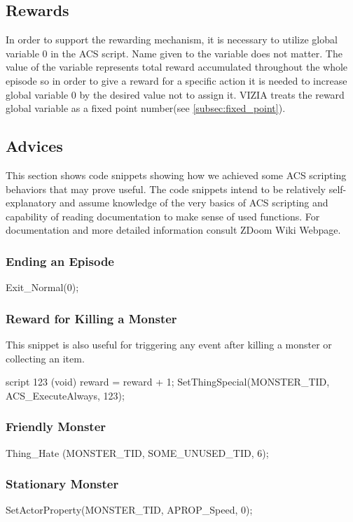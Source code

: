 \documentclass[english,bachelor,a4paper,twoside]{ppfcmthesis}
\begin{document}
	\subsection{Rewards}
		In order to support the rewarding mechanism, it is necessary to utilize global variable 0 in the ACS script. Name given to the variable does not matter. The value of the variable represents total reward accumulated throughout the whole episode so in order to give a reward for a specific action it is needed to increase global variable 0 by the desired value not to assign it. VIZIA treats the reward global variable as a fixed point number(see \ref{subsec:fixed_point}).

	\subsection{Advices}
		This section shows code snippets showing how we achieved some ACS scripting behaviors that may prove useful. The code snippets intend to be relatively self-explanatory and assume knowledge of the very basics of ACS scripting and capability of reading documentation to make sense of used functions. For documentation and more detailed information consult ZDoom Wiki Webpage\cite{zdoom-wiki}.

		\subsubsection*{Ending an Episode}

			\begin{clinee}
Exit_Normal(0);
			\end{clinee}
		\subsubsection*{Reward for Killing a Monster} This snippet is also useful for triggering any event after killing a monster or collecting an item.
			\begin{clinee}
script 123 (void)
{
	reward = reward + 1;
}
SetThingSpecial(MONSTER_TID, ACS_ExecuteAlways, 123);
			\end{clinee}
\subsubsection*{Friendly Monster}
			\begin{clinee}
Thing_Hate (MONSTER_TID, SOME_UNUSED_TID, 6);
			\end{clinee}
		\subsubsection*{Stationary Monster}
			\begin{clinee}
SetActorProperty(MONSTER_TID, APROP_Speed, 0);
			\end{clinee}
\end{document}
